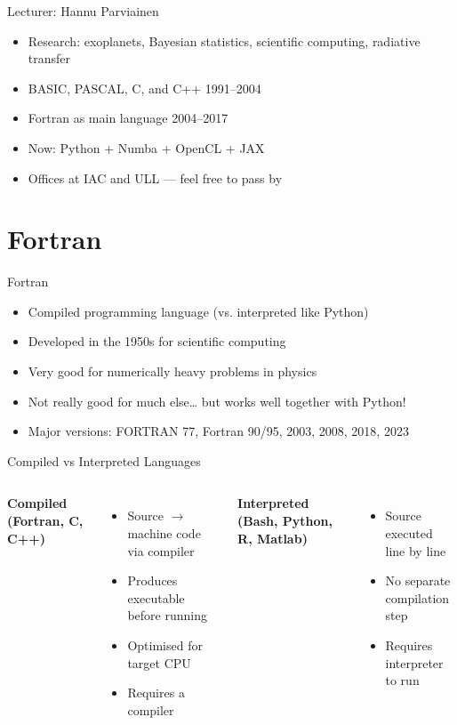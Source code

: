 \begin{frame}{Lecturer: Hannu Parviainen}
  \begin{itemize}
    \item Research: exoplanets, Bayesian statistics, scientific computing, radiative transfer
    \item BASIC, PASCAL, C, and C++ 1991--2004
    \item Fortran as main language 2004--2017
    \item Now: Python + Numba + OpenCL + JAX
    \item Offices at IAC and ULL — feel free to pass by
  \end{itemize}
\end{frame}



\section{Fortran}
\begin{frame}{Fortran}
	\begin{itemize}
		\item Compiled programming language (vs. interpreted like Python)
		\item Developed in the 1950s for scientific computing
		\item Very good for numerically heavy problems in physics
		\item Not really good for much else… but works well together with Python!
		\item Major versions: FORTRAN 77, Fortran 90/95, 2003, 2008, 2018, 2023
	\end{itemize}
\end{frame}


\begin{frame}{Compiled vs Interpreted Languages}
	\begin{columns}[T]
		\textbf{Compiled (Fortran, C, C++)}
		\begin{itemize}
			\item Source $\to$ machine code via compiler
			\item Produces executable before running
			\item Optimised for target CPU
			\item Requires a compiler
		\end{itemize}
		
		\textbf{Interpreted (Bash, Python, R, Matlab)}
		\begin{itemize}
			\item Source executed line by line
			\item No separate compilation step
			\item Requires interpreter to run
		\end{itemize}
	\end{columns}
\end{frame}

